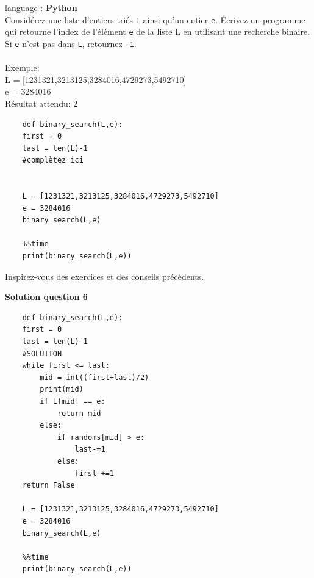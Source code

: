 \begin{Exercice}[10 minutes] language : \textbf{Python}\\

Considérez une liste d’entiers triés \lstinline{L} ainsi qu’un entier \lstinline{e}. Écrivez un programme qui retourne l'index de l'élément \lstinline{e} de la liste L en utilisant une recherche binaire. Si \lstinline{e} n’est pas dans \lstinline{L}, retournez \lstinline{-1}.\\\\

Exemple:\\

    L = [1231321,3213125,3284016,4729273,5492710] \\

    e = 3284016\\

Résultat attendu: 2\\

    \begin{verbatim}
    def binary_search(L,e):
    first = 0
    last = len(L)-1
    #complètez ici
    
    
    L = [1231321,3213125,3284016,4729273,5492710]
    e = 3284016
    binary_search(L,e)
    
    %%time
    print(binary_search(L,e))
    \end{verbatim}

\begin{conseil}
    Inspirez-vous des exercices et des conseils précédents. 
\end{conseil}

\textbf{Solution question 6}

    \begin{verbatim}
    def binary_search(L,e):
    first = 0
    last = len(L)-1
    #SOLUTION
    while first <= last:
        mid = int((first+last)/2)
        print(mid)
        if L[mid] == e:
            return mid
        else:
            if randoms[mid] > e:
                last-=1
            else:
                first +=1
    return False
    
    L = [1231321,3213125,3284016,4729273,5492710]
    e = 3284016
    binary_search(L,e)
    
    %%time
    print(binary_search(L,e))
    \end{verbatim}

\end{Exercice}


